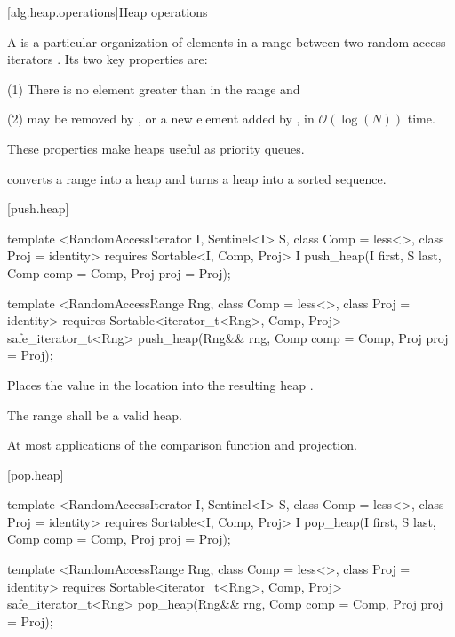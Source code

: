 [alg.heap.operations]{Heap operations}

\pnum
A
is a particular organization of elements in a range between two random access iterators
.
Its two key properties are:

\begin{description}
\item{(1)} There is no element greater than
in the range and
\item{(2)} 
may be removed by
,
or a new element added by
,
in
$\mathcal{O}(\log(N))$
time.
\end{description}

\pnum
These properties make heaps useful as priority queues.

\pnum
{}
converts a range into a heap and
turns a heap into a sorted sequence.

[push.heap]{}

%
\begin{itemdecl}
template <RandomAccessIterator I, Sentinel<I> S, class Comp = less<>,
    class Proj = identity>
  requires Sortable<I, Comp, Proj>
  I push_heap(I first, S last, Comp comp = Comp{}, Proj proj = Proj{});

template <RandomAccessRange Rng, class Comp = less<>, class Proj = identity>
  requires Sortable<iterator_t<Rng>, Comp, Proj>
  safe_iterator_t<Rng>
    push_heap(Rng&& rng, Comp comp = Comp{}, Proj proj = Proj{});
\end{itemdecl}

\begin{itemdescr}
\pnum
\effects
Places the value in the location
into the resulting heap
.

\pnum
\requires
The range
shall be a valid heap.

\pnum
\returns {}

\pnum
\complexity
At most
applications of the comparison function and projection.
\end{itemdescr}

[pop.heap]{}

%
\begin{itemdecl}
template <RandomAccessIterator I, Sentinel<I> S, class Comp = less<>,
    class Proj = identity>
  requires Sortable<I, Comp, Proj>
  I pop_heap(I first, S last, Comp comp = Comp{}, Proj proj = Proj{});

template <RandomAccessRange Rng, class Comp = less<>, class Proj = identity>
  requires Sortable<iterator_t<Rng>, Comp, Proj>
  safe_iterator_t<Rng>
    pop_heap(Rng&& rng, Comp comp = Comp{}, Proj proj = Proj{});
\end{itemdecl}

